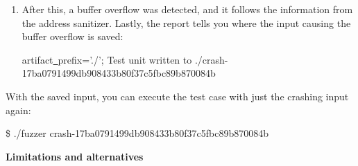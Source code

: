 \begin{enumerate}
\item After this, a buffer overflow was detected, and it follows the information from the address sanitizer. Lastly, the report tells you where the input causing the buffer overflow is saved:
\begin{tcolorbox}[colback=white,colframe=black]
artifact\underline{~}prefix='./'; Test unit written to ./crash-17ba0791499db908433b80f37c5fbc89b87\allowbreak 0084b
\end{tcolorbox}

\end{enumerate}

With the saved input, you can execute the test case with just the crashing input again:\par

\begin{tcolorbox}[colback=white,colframe=black]
\$ ./fuzzer crash-17ba0791499db908433b80f37c5fbc89b870084b
\end{tcolorbox}

\hspace*{\fill} \par %
\textbf{Limitations and alternatives}




















































